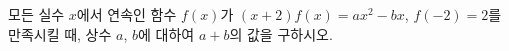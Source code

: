 모든 실수 $x$에서 연속인 함수 $f(x)$가 $(x+2)f(x)=ax^2-bx$, $f(-2)=2$를 만족시킬 때, 상수 $a$, $b$에 대하여 $a+b$의 값을 구하시오.
